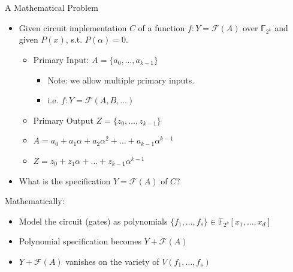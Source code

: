 \documentclass[xcolor=dvipsnames]{beamer}
\newcommand{\Fkk}{{\mathbb{F}}_{2^k}}
\newcommand{\F}{{\mathcal{F}}}
\begin{document}
\begin{frame}{\large {A Mathematical Problem}}

\begin{itemize}
\item Given \alert{circuit implementation} $C$ of a function $f: Y = \F(A)$ over $\Fkk$ and given $P(x)$, s.t. $P(\alpha) = 0$.
 \begin{itemize}
 \item Primary Input: $A = \{a_0, \dots, a_{k-1}\}$
 	\begin{itemize}
 	\item Note: we allow multiple primary inputs.
	\item i.e. $f: Y = \F(A,B,\dots)$
        \end{itemize}
 \item Primary Output $Z = \{z_0, \dots, z_{k-1}\}$
 \item $A = a_0 + a_1 \alpha + a_2\alpha^2 + \dots + a_{k-1} \alpha^{k-1}$
 \item $Z = z_0 + z_1 \alpha + \dots + z_{k-1} \alpha^{k-1}$
 \end{itemize}
\item What is the specification $Y = \F(A)$ of $C$?
\end{itemize}

Mathematically:
\begin{itemize}
\item Model the circuit (gates) as polynomials $\{f_1, \dots, f_s\}
  \in \mathbb{F}_{2^k}[x_1, \dots, x_d]$
\item Polynomial specification becomes $Y + \F(A)$
\item $Y + \F(A)$ \alert{vanishes} on the \alert{variety} of $V(f_1, \dots, f_s)$
\end{itemize}


\end{frame}
\end{document}
